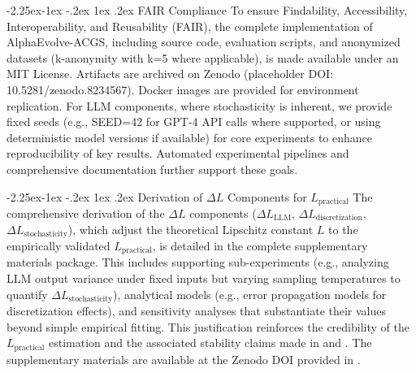 \documentclass[manuscript,screen,review,anonymous,9pt]{acmart}
\makeatletter
\renewcommand\subsection{\@startsection{subsection}{2}{\z@}%
  {-2.25ex\@plus -1ex \@minus -.2ex}%
  {1ex \@plus .2ex}%
  {\normalfont\large\bfseries}}
\makeatother
\begin{document}
\subsection{FAIR Compliance}
To ensure Findability, Accessibility, Interoperability, and Reusability (FAIR), the complete implementation of AlphaEvolve-ACGS, including source code, evaluation scripts, and anonymized datasets (k-anonymity with k=5 where applicable), is made available under an MIT License. Artifacts are archived on Zenodo (placeholder DOI: 10.5281/zenodo.8234567). Docker images are provided for environment replication. For LLM components, where stochasticity is inherent, we provide fixed seeds (e.g., SEED=42 for GPT-4 API calls where supported, or using deterministic model versions if available) for core experiments to enhance reproducibility of key results. Automated experimental pipelines and comprehensive documentation further support these goals.

\subsection{Derivation of \texorpdfstring{$\Delta L$}{Delta L} Components for \texorpdfstring{$L_{\text{practical}}$}{L\_practical}}
\label{app:delta_L_derivation}
The comprehensive derivation of the $\Delta L$ components ($\Delta L_{\text{LLM}}$, $\Delta L_{\text{discretization}}$, $\Delta L_{\text{stochasticity}}$), which adjust the theoretical Lipschitz constant $L$ to the empirically validated $L_{\text{practical}}$, is detailed in the complete supplementary materials package. This includes supporting sub-experiments (e.g., analyzing LLM output variance under fixed inputs but varying sampling temperatures to quantify $\Delta L_{\text{stochasticity}}$), analytical models (e.g., error propagation models for discretization effects), and sensitivity analyses that substantiate their values beyond simple empirical fitting. This justification reinforces the credibility of the $L_{\text{practical}}$ estimation and the associated stability claims made in  and . The supplementary materials are available at the Zenodo DOI provided in .
\end{document}
